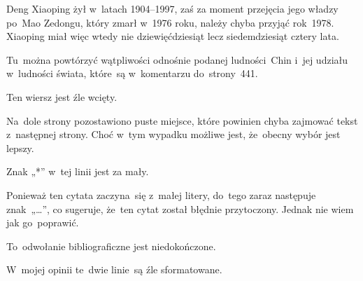 \documentclass[a4paper,11pt]{article}
\numberwithin{equation}{section}
\begin{document}
\VerSpaceFour





\noindent
{} Deng Xiaoping żył w~latach 1904--1997, zaś za moment
przejęcia jego władzy po~Mao Zedongu, który zmarł w~1976 roku, należy
chyba przyjąć rok~1978. Xiaoping miał więc wtedy nie dziewięćdziesiąt lecz
siedemdziesiąt cztery lata.

\VerSpaceFour





\noindent
{} Tu~można powtórzyć wątpliwości odnośnie podanej
ludności~Chin i~jej udziału w~ludności świata, które~są w~komentarzu
do~strony~441.

\VerSpaceFour





\noindent
{} Ten wiersz jest źle wcięty.

\VerSpaceFour





\noindent
{} Na~dole strony pozostawiono puste miejsce, które powinien chyba
zajmować tekst z~następnej strony. Choć w~tym wypadku możliwe jest,
że~obecny wybór jest lepszy.

\VerSpaceFour





\noindent
{} Znak „*” w~tej linii jest za mały.

\VerSpaceFour





\noindent
{} Ponieważ ten cytata zaczyna~się z~małej litery, do~tego
zaraz następuje znak~„\ldots”, co sugeruje, że~ten cytat został błędnie
przytoczony. Jednak nie wiem jak go~poprawić.

\VerSpaceFour





\noindent
{} To~odwołanie bibliograficzne jest niedokończone.

\VerSpaceFour





\noindent
{} W~mojej opinii te~dwie linie~są źle sformatowane.

\VerSpaceFour
\end{document}

